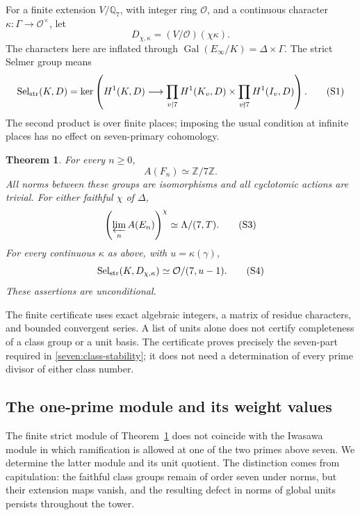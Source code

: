 \documentclass[11pt]{article}
\newtheorem{theorem}{Theorem}
\begin{document}
For a finite extension $V/\mathbb Q_7$, with integer ring $\mathcal O$, and
a continuous character $\kappa:\Gamma\longrightarrow\mathcal O^\times$,
let
\[
 D_{\chi,\kappa}=(V/\mathcal O)(\chi\kappa).
\]
The characters here are inflated through
$\operatorname{Gal}(E_\infty/K)=\Delta\times\Gamma$.
The strict Selmer group means
\[
 \operatorname{Sel}_{\rm str}(K,D)=
 \ker\left(
 H^1(K,D)\longrightarrow
 \prod_{v\mid7}H^1(K_v,D)
 \times\prod_{v\nmid7}H^1(I_v,D)\right).
 \tag{S1}\label{seven:strict-definition}
\]
The second product is over finite places; imposing the usual condition at
infinite places has no effect on seven-primary cohomology.

\begin{theorem}\label{seven:main}
For every $n\ge0$,
\[
 A(F_n)\simeq\mathbb Z/7\mathbb Z.
 \tag{S2}\label{seven:class-stability}
\]
All norms between these groups are isomorphisms and all cyclotomic actions
are trivial. For either faithful $\chi$ of $\Delta$,
\[
 \left(\varprojlim_n A(E_n)\right)^\chi
 \simeq\Lambda/(7,T).
 \tag{S3}\label{seven:iwasawa}
\]
For every continuous $\kappa$ as above, with $u=\kappa(\gamma)$,
\[
 \operatorname{Sel}_{\rm str}(K,D_{\chi,\kappa})
 \simeq\mathcal O/(7,u-1).
 \tag{S4}\label{seven:all-characters}
\]
These assertions are unconditional.
\end{theorem}

The finite certificate uses exact algebraic integers, a matrix of
residue characters, and bounded convergent series. A list of units alone
does not certify completeness of a class group or a unit basis. The certificate proves precisely the seven-part required in
\eqref{seven:class-stability}; it does not need a determination of every
prime divisor of either class number.

\subsection{The one-prime module and its weight values}
\label{seven:universal-norms}

The finite strict module of Theorem~\ref{seven:main} does not coincide
with the Iwasawa module in which ramification is allowed at one of the
two primes above seven. We determine the latter module and its unit
quotient. The distinction comes from capitulation: the faithful class
groups remain of order seven under norms, but their extension maps
vanish, and the resulting defect in norms of global units persists
throughout the tower.
\end{document}
